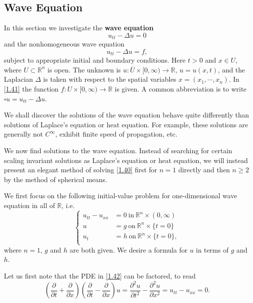 \subsection{Wave Equation}
In this section we investigate the \textbf{wave equation}
\begin{equation}\label{1.40}
u_{tt}-\Delta u=0
\end{equation}
and the nonhomogeneous wave equation 
\begin{equation}\label{1.41}
u_{tt}-\Delta u=f,
\end{equation}
subject to appropriate initial and boundary conditions. Here $t>0$ and $x\in U$, where $U\subset\mathbb{R}^n$ is open. The unknown is $u:\overline{U}\times[0,\infty)\to\mathbb{R}$, $u=u(x,t)$, and the Laplacian $\Delta$ is taken with respect to the spatial variables $x=(x_1,\cdots,x_n)$. In \eqref{1.41} the function $f:U\times[0,\infty)\to\mathbb{R}$ is given. A common abbreviation is to write $\square u=u_{tt}-\Delta u$.\par
We shall discover the solutions of the wave equation behave quite differently than solutions of Laplace's equation or heat equation. For example, these solutions are generally not $C^\infty$, exhibit finite speed of propagation, etc.\par
We now find solutions to the wave equation. Instead of searching for certain scaling invariant solutions as Laplace's equation or heat equation, we will instead present an elegant method of solving \eqref{1.40} first for $n=1$ directly and then $n\ge 2$ by the method of spherical means.\par
We first focus on the following initial-value problem for one-dimensional wave equation in all of $\mathbb{R}$, i.e.  
\begin{equation}\label{1.42}
\left\{ \begin{aligned}
	u_{tt}-u_{xx}&=0\ \text{in}\ \mathbb{R}^n\times(0,\infty)\\
	u&=g\ \text{on}\ \mathbb{R}^n\times\{t=0\}\\
	u_t&=h\ \text{on}\ \mathbb{R}^n\times\{t=0\},\\
\end{aligned} \right. 
\end{equation}
where $n=1$, $g$ and $h$ are both given. We desire a formula for $u$ in terms of $g$ and $h$.\par
Let us first note that the PDE in \eqref{1.42} can be factored, to read 
$$
\left( \frac{\partial}{\partial t}+\frac{\partial}{\partial x} \right) \left( \frac{\partial}{\partial t}-\frac{\partial}{\partial x} \right) u=\frac{\partial ^2u}{\partial t^2}-\frac{\partial ^2u}{\partial x^2}=u_{tt}-u_{xx}=0.
$$
